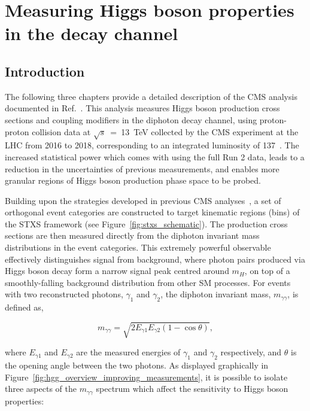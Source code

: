 \chapter{Measuring Higgs boson properties in the \Hgg decay channel}
\label{chap:hgg_overview}

\section{Introduction}\label{sec:hgg_introduction}
The following three chapters provide a detailed description of the CMS \Hgg analysis documented in Ref.~\cite{Sirunyan:2021ybb}. This analysis measures Higgs boson production cross sections and coupling modifiers in the diphoton decay channel, using proton-proton collision data at $\sqrt{s}$~=~13~TeV collected by the CMS experiment at the LHC from 2016 to 2018, corresponding to an integrated luminosity of 137~\fbinv. The increased statistical power which comes with using the full Run 2 data, leads to a reduction in the uncertainties of previous \Hgg measurements, and enables more granular regions of Higgs boson production phase space to be probed. 

Building upon the strategies developed in previous CMS \Hgg analyses~\cite{Sirunyan:2018ouh,CMS-PAS-HIG-18-029,Sirunyan:2020sum}, a set of orthogonal event categories are constructed to target kinematic regions (bins) of the STXS framework (see Figure~\ref{fig:stxs_schematic}). The production cross sections are then measured directly from the diphoton invariant mass distributions in the event categories. This extremely powerful observable effectively distinguishes signal from background, where photon pairs produced via Higgs boson decay form a narrow signal peak centred around $m_H$, on top of a smoothly-falling background distribution from other SM processes. For events with two reconstructed photons, $\gamma_1$ and $\gamma_2$, the diphoton invariant mass, $m_{\gamma\gamma}$, is defined as,

\begin{equation}\label{eq:mgg}
    m_{\gamma\gamma} = \sqrt{2E_{\gamma1}E_{\gamma2}(1-\cos{\theta})},
\end{equation}

\noindent
where $E_{\gamma1}$ and $E_{\gamma2}$ are the measured energies of $\gamma_1$ and $\gamma_2$ respectively, and $\theta$ is the opening angle between the two photons. As displayed graphically in Figure~\ref{fig:hgg_overview_improving_measurements}, it is possible to isolate three aspects of the $m_{\gamma\gamma}$ spectrum which affect the sensitivity to Higgs boson properties: 

